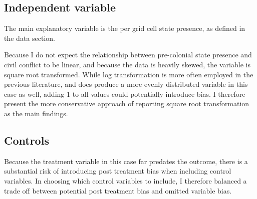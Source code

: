 \documentclass[12pt]{article}
\begin{document}

\subsection{Independent variable}

The main explanatory variable is the per grid cell state presence, as defined in
the data section.


Because I do not expect the relationship between pre-colonial state presence and
civil conflict to be linear, and because the data is heavily skewed, the
variable is square root transformed. While log transformation is more often
employed in the previous literature, and does produce a more evenly distributed
variable in this case as well, adding 1 to all values could potentially
introduce bias. I therefore present the more conservative approach of reporting
square root transformation as the main findings.

\subsection{Controls}

Because the treatment variable in this case far predates the outcome, there is a
substantial risk of introducing post treatment bias when including control
variables. In choosing which control variables to include, I therefore 
balanced a trade off between potential post treatment bias and omitted variable
bias. 
\end{document}
